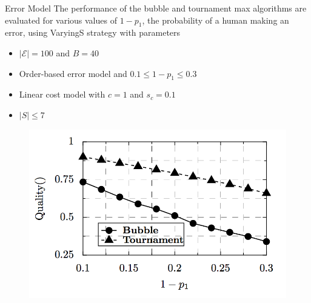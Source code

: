 \documentclass{beamer}
\begin{document}

\begin{frame}{Error Model}
\vspace{5pt}
	The performance of the bubble and tournament max algorithms are evaluated for various values of $1 − p_1$, the probability of a human making an error, using VaryingS strategy with parameters
	\begin{itemize}
		\item $\left\vert{\mathcal{E}}\right\vert=100$ and $B=40$
		\item Order-based error model and $0.1 \le 1-p_1 \le 0.3$
		\item Linear cost model with $c=1$ and $s_c = 0.1$   %
		\item $\left\vert{S}\right\vert\le7$ %
	\end{itemize}
	
	\begin{figure}
		\centering
		\includegraphics[scale=0.35]{images/errmodel.png}
	\end{figure}	

	
\end{frame}
\end{document}
